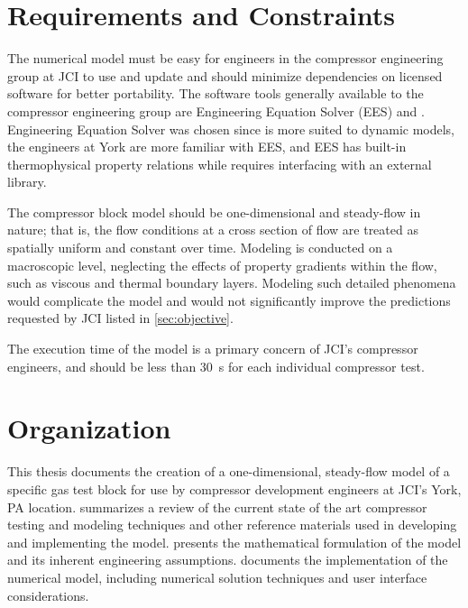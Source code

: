 \section{Requirements and Constraints} \label{sec:requirements}
The numerical model must be easy for engineers in the compressor engineering group at JCI 
to use and update and should minimize dependencies on licensed software for better portability. 
The software tools generally available to the compressor engineering group are 
Engineering Equation Solver (EES) and \MLS{}. 
Engineering Equation Solver was chosen since \MLS{} is more suited to dynamic models, 
the engineers at York are more familiar with EES, 
and EES has built-in thermophysical property relations 
while \MLS{} requires interfacing with an external library.

The compressor block model should be one-dimensional and steady-flow in nature; 
that is, the flow conditions at a cross section of flow 
are treated as spatially uniform and constant over time. 
Modeling is conducted on a macroscopic level, 
neglecting the effects of property gradients within the flow, 
such as viscous and thermal boundary layers. 
Modeling such detailed phenomena would complicate the model 
and would not significantly improve the predictions requested by JCI listed in \cref{sec:objective}.

The execution time of the model is a primary concern of JCI's compressor engineers, 
and should be less than \SI{30}{\second} for each individual compressor test.

\section{Organization} \label{sec:organization}
This thesis documents the creation of a one-dimensional, steady-flow model 
of a specific gas test block for use by compressor development engineers at JCI's York, PA location. 
 summarizes a review of the current state of the art 
compressor testing and modeling techniques 
and other reference materials used in developing and implementing the model. 
 presents the mathematical formulation of the model 
and its inherent engineering assumptions. 
 documents the implementation of the numerical model, 
including numerical solution techniques and user interface considerations. 

